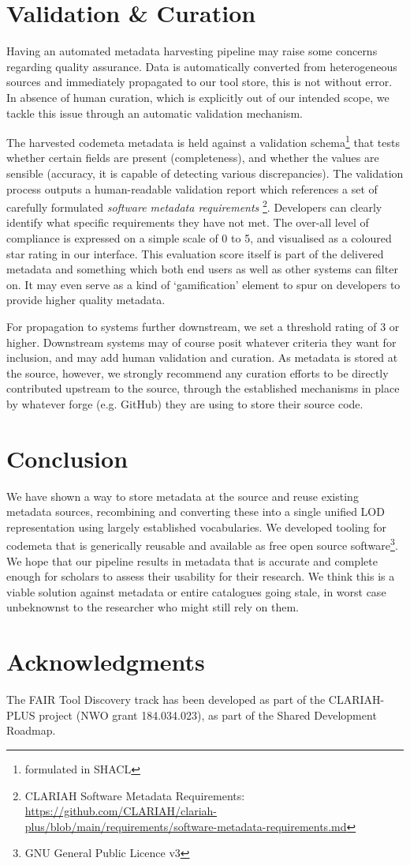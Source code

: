 \documentclass[a4paper,11pt]{article}
\begin{document}
\section{Validation \& Curation}

Having an automated metadata harvesting pipeline may raise some concerns
regarding quality assurance. Data is automatically converted from heterogeneous
sources and immediately propagated to our tool store, this is not without
error. In absence of human curation, which is explicitly out of our intended
scope, we tackle this issue through an automatic validation mechanism.

The harvested codemeta metadata is held against a validation
schema\footnote{formulated in SHACL} that tests whether certain fields are
present (completeness), and whether the values are sensible (accuracy, it is
capable of detecting various discrepancies). The validation process outputs a
human-readable validation report which references a set of carefully formulated
\emph{software metadata requirements} \footnote{CLARIAH Software Metadata Requirements: \url{https://github.com/CLARIAH/clariah-plus/blob/main/requirements/software-metadata-requirements.md}}. Developers can clearly identify what
specific requirements they have not met. The over-all level of compliance is expressed on a
simple scale of 0 to 5, and visualised as a coloured star rating in our
interface. This evaluation score itself is part of the delivered metadata and
something which both end users as well as other systems can filter on. It may
even serve as a kind of `gamification' element to spur on developers to provide
higher quality metadata. 

For propagation to systems further downstream, we set a threshold rating of 3
or higher. Downstream systems may of course posit whatever criteria they want
for inclusion, and may add human validation and curation. As metadata is stored
at the source, however, we strongly recommend any curation efforts to be
directly contributed upstream to the source, through the established mechanisms
in place by whatever forge (e.g. GitHub) they are using to store their source
code.

\section{Conclusion}

We have shown a way to store metadata at the source and reuse existing metadata
sources, recombining and converting these into a single unified LOD
representation using largely established vocabularies. We developed tooling for
codemeta that is generically reusable and available as free open source
software\footnote{GNU General Public Licence v3}. We hope that our pipeline
results in metadata that is accurate and complete enough for scholars to assess
their usability for their research. We think this is a viable solution
against metadata or entire catalogues going stale, in worst
case unbeknownst to the researcher who might still rely on them.

\section*{Acknowledgments}

The FAIR Tool Discovery track has been developed as part of the CLARIAH-PLUS
project (NWO grant 184.034.023), as part of the Shared Development Roadmap.

\printbibliography
\end{document}
